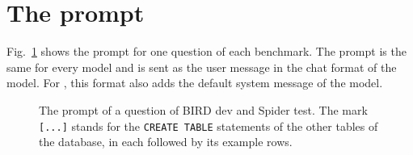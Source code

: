 \section{The prompt}\label{app:prompt}

Fig.~\ref{fig:prompt} shows the prompt for one question of each
benchmark. The prompt is the same for every model and is sent as the
user message in the chat format of the model. For , this
format also adds the default system message of the model.

\begin{figure}[!ht]

\noindent{\ttfamily\fontsize{7}{8}\selectfont [...]}

\medskip
{}

\noindent{\ttfamily\fontsize{7}{8}\selectfont [...]}

\caption{The prompt of a question of  BIRD dev and  Spider test.
The mark \texttt{[...]} stands for the \texttt{CREATE TABLE} statements
of the other tables of the database, in  each followed by its example
rows.}\label{fig:prompt}
\end{figure}
